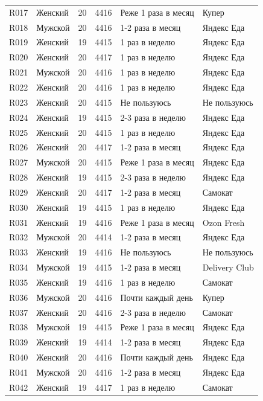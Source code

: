 {\begin{longtable}{L{1.05cm}L{2.2cm}R{1.35cm}R{1.35cm}L{4.2cm}L{4.0cm}}
R017 & Женский & 20 & 4416 & Реже 1 раза в месяц & Купер \\
R018 & Мужской & 20 & 4416 & 1-2 раза в месяц & Яндекс Еда \\
R019 & Женский & 19 & 4415 & 1 раз в неделю & Яндекс Еда \\
R020 & Женский & 20 & 4417 & 1 раз в неделю & Яндекс Еда \\
R021 & Мужской & 20 & 4416 & 1 раз в неделю & Яндекс Еда \\
R022 & Женский & 20 & 4416 & 1 раз в неделю & Яндекс Еда \\
R023 & Женский & 20 & 4415 & Не пользуюсь & Не пользуюсь \\
R024 & Женский & 19 & 4415 & 2-3 раза в неделю & Яндекс Еда \\
R025 & Женский & 20 & 4415 & 1 раз в неделю & Яндекс Еда \\
R026 & Женский & 20 & 4417 & 1-2 раза в месяц & Яндекс Еда \\
R027 & Мужской & 20 & 4415 & Реже 1 раза в месяц & Яндекс Еда \\
R028 & Женский & 19 & 4415 & 2-3 раза в неделю & Яндекс Еда \\
R029 & Женский & 20 & 4417 & 1-2 раза в месяц & Самокат \\
R030 & Женский & 19 & 4415 & 1 раз в неделю & Яндекс Еда \\
R031 & Женский & 19 & 4416 & Реже 1 раза в месяц & Ozon Fresh \\
R032 & Мужской & 20 & 4414 & 1-2 раза в месяц & Яндекс Еда \\
R033 & Женский & 19 & 4416 & Не пользуюсь & Не пользуюсь \\
R034 & Мужской & 19 & 4415 & 1-2 раза в месяц & Delivery Club \\
R035 & Женский & 19 & 4416 & 1 раз в неделю & Самокат \\
R036 & Мужской & 20 & 4416 & Почти каждый день & Купер \\
R037 & Женский & 20 & 4416 & 2-3 раза в неделю & Самокат \\
R038 & Мужской & 19 & 4415 & Реже 1 раза в месяц & Яндекс Еда \\
R039 & Женский & 19 & 4414 & 1-2 раза в месяц & Яндекс Еда \\
R040 & Женский & 20 & 4416 & Почти каждый день & Яндекс Еда \\
R041 & Мужской & 20 & 4416 & 1-2 раза в месяц & Яндекс Еда \\
R042 & Женский & 19 & 4417 & 1 раз в неделю & Самокат \\

\end{longtable}}
